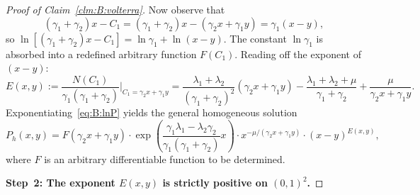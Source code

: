 \begin{proof}[Proof of Claim~\ref{clm:B:volterra}]
Now observe that
\begin{equation}
    (\gamma_1+\gamma_2)x - C_1
    = (\gamma_1+\gamma_2)x - (\gamma_2 x + \gamma_1 y)
    = \gamma_1(x-y),
    \label{eq:B:simplify}
\end{equation}
so $\ln[(\gamma_1+\gamma_2)x-C_1] = \ln\gamma_1 + \ln(x-y)$.  The constant
$\ln\gamma_1$ is absorbed into a redefined arbitrary function $F(C_1)$.  Reading
off the exponent of $(x-y)$:
\begin{equation}
    E(x,y) := \frac{N(C_1)}{\gamma_1(\gamma_1+\gamma_2)}\bigg|_{C_1=\gamma_2 x+\gamma_1 y}
    = \frac{\lambda_1+\lambda_2}{(\gamma_1+\gamma_2)^2}(\gamma_2 x+\gamma_1 y)
    - \frac{\lambda_1+\lambda_2+\mu}{\gamma_1+\gamma_2}
    + \frac{\mu}{\gamma_2 x+\gamma_1 y}.
    \label{eq:B:E}
\end{equation}
Exponentiating~\eqref{eq:B:lnP} yields the general homogeneous solution
\begin{equation}
    P_h(x,y) = F(\gamma_2 x+\gamma_1 y)
    \cdot \exp\!\left(\frac{\gamma_1\lambda_1-\lambda_2\gamma_2}{\gamma_1(\gamma_1+\gamma_2)}x\right)
    \cdot x^{-\mu/(\gamma_2 x+\gamma_1 y)}
    \cdot (x-y)^{E(x,y)},
    \label{eq:B:Ph}
\end{equation}
where $F$ is an arbitrary differentiable function to be determined.

\medskip\noindent\textbf{Step~2: The exponent $E(x,y)$ is strictly positive on $(0,1)^2$.}


\end{proof}
